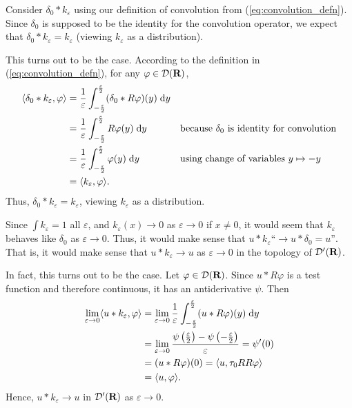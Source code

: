 \documentclass{homework}
\begin{document}
	\question Consider $\delta_0 * k_\varepsilon$ using our definition of convolution from (\ref{eq:convolution_defn}). Since $\delta_0$ is supposed to be the identity for the convolution operator, we expect that $\delta_0 * k_\varepsilon = k_\varepsilon$ (viewing $k_\varepsilon$ as a distribution).
	
	This turns out to be the case. According to the definition in (\ref{eq:convolution_defn}), for any $\varphi \in \mathcal{D}(\textnormal{\bf R})$,
	\begin{align}
		\langle\delta_0 * k_\varepsilon, \varphi\rangle &= \frac{1}{\varepsilon}\int_{-\frac{\varepsilon}{2}}^\frac{\varepsilon}{2} (\delta_0 * R\varphi)(y)\;\text{d} y &&\\
		&= \frac{1}{\varepsilon}\int_{-\frac{\varepsilon}{2}}^\frac{\varepsilon}{2} R\varphi(y)\;\text{d} y  && \text{because $\delta_0$ is identity for convolution}\\
		&= \frac{1}{\varepsilon}\int_{-\frac{\varepsilon}{2}}^\frac{\varepsilon}{2}  \varphi(y)\;\text{d} y && \text{using change of variables $y\mapsto -y$}\\
		&= \langle k_\varepsilon, \varphi \rangle.
	\end{align}
	Thus, $\delta_0 * k_\varepsilon = k_\varepsilon$, viewing $k_\varepsilon$ as a distribution.
	
	\question Since $\int k_\varepsilon = 1$ all $\varepsilon$, and $k_\varepsilon(x) \to 0$ as $\varepsilon \to 0$ if $x \ne 0$, it would seem that $k_\varepsilon$ behaves like $\delta_0$ as $\varepsilon \to 0$. Thus, it would make sense that $u * k_\varepsilon \text{``} \to u * \delta_0 = u\text{''}$. That is, it would make sense that $u * k_\varepsilon \to u$ as $\varepsilon \to 0$ in the topology of $\mathcal{D}'(\textnormal{\bf R})$.
	
	In fact, this turns out to be the case. Let $\varphi \in \mathcal{D}(\textnormal{\bf R})$. Since $u*R\varphi$ is a test function and therefore continuous, it has an antiderivative $\psi$. Then
	\begin{align}
		\lim_{\varepsilon \to 0} \langle u * k_\varepsilon, \varphi\rangle &= \lim_{\varepsilon\to 0}\frac{1}{\varepsilon}\int_{-\frac{\varepsilon}{2}}^\frac{\varepsilon}{2} (u * R\varphi)(y)\;\text{d} y \\
		&= \lim_{\varepsilon \to 0} \frac{\psi\left(\frac{\varepsilon}{2}\right) - \psi\left(-\frac{\varepsilon}{2}\right)}{\varepsilon} = \psi'(0) \\
		&= (u * R\varphi)(0) = \langle u, \tau_0RR\varphi\rangle \\
		&= \langle u, \varphi \rangle.
	\end{align}
	Hence, $u * k_\varepsilon \to u$ in $\mathcal{D}'(\textnormal{\bf R})$ as $\varepsilon \to 0$.
	
	\question
\end{document}
